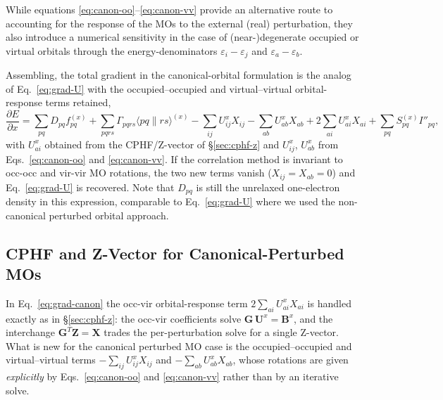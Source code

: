 \documentclass[12pt]{article}
\newcommand{\adb}[2]{\langle #1 \| #2 \rangle}
\begin{document}
While equations \eqref{eq:canon-oo}--\eqref{eq:canon-vv} provide an alternative
route to accounting for the response of the MOs to the external (real)
perturbation, they also introduce a numerical sensitivity in the case of
(near-)degenerate occupied or virtual orbitals
through the energy-denominators
$\varepsilon_i-\varepsilon_j$ and
$\varepsilon_a-\varepsilon_b$.\cite{Handy85:MP2Hessians}

\noindent
Assembling, the total gradient in the canonical-orbital formulation is the analog
of Eq.~\eqref{eq:grad-U} with the occupied--occupied and virtual--virtual
orbital-response terms retained,
\begin{equation}
\frac{\partial E}{\partial x}
= \sum_{pq} D_{pq} f^{(x)}_{pq}
+ \sum_{pqrs}\Gamma_{pqrs}\adb{pq}{rs}^{(x)}
- \sum_{ij} U^x_{ij} X_{ij}
- \sum_{ab} U^x_{ab} X_{ab}
+ 2\sum_{ai} U^x_{ai} X_{ai}
+ \sum_{pq} S^{(x)}_{pq} I''_{pq},
\label{eq:grad-canon}
\end{equation}
with $U^x_{ai}$ obtained from the CPHF/Z-vector of \S\ref{sec:cphf-z} and $U^x_{ij}$, $U^x_{ab}$
from Eqs.~\eqref{eq:canon-oo} and \eqref{eq:canon-vv}.  If the correlation
method is invariant to occ-occ and vir-vir MO rotations, the two new terms
vanish ($X_{ij}=X_{ab}=0$) and Eq.~\eqref{eq:grad-U} is recovered.  Note that $D_{pq}$ is still the unrelaxed
one-electron density in this expression, comparable to Eq.~\eqref{eq:grad-U} where we used the non-canonical perturbed orbital
approach.

\subsection{CPHF and Z-Vector for Canonical-Perturbed MOs}
\label{sec:cphf-z-canon}

In Eq.~\eqref{eq:grad-canon} the occ-vir orbital-response term $2\sum_{ai}U^x_{ai}X_{ai}$
is handled exactly as in \S\ref{sec:cphf-z}: the occ-vir coefficients solve
$\mathbf{G}\,\mathbf{U}^{x}=\mathbf{B}^{x}$, and the interchange
$\mathbf{G}^{T}\mathbf{Z}=\mathbf{X}$ trades the per-perturbation solve for a single
Z-vector.  What is new for the canonical perturbed MO case is the occupied--occupied and
virtual--virtual terms $-\sum_{ij}U^x_{ij}X_{ij}$ and $-\sum_{ab}U^x_{ab}X_{ab}$,
whose rotations are given {\em explicitly} by Eqs.~\eqref{eq:canon-oo} and
\eqref{eq:canon-vv} rather than by an iterative solve.
\end{document}
